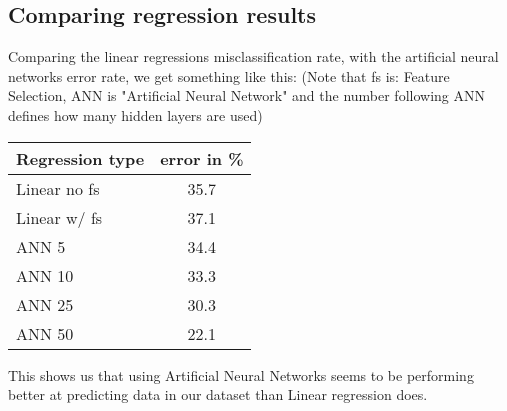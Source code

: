 \subsection{Comparing regression results}
Comparing the linear regressions misclassification rate, with the artificial neural networks error rate, we get something like this: (Note that fs is: Feature Selection, ANN is "Artificial Neural Network" and the number following ANN defines how many hidden layers are used)
\begin{table}
\begin{longtable}{lc} \hline
Regression type & error in \% \\ \hline
Linear no fs & 35.7 \\
Linear w/ fs & 37.1\\
ANN 5 & 34.4 \\
ANN 10 & 33.3 \\
ANN 25 & 30.3 \\
ANN 50 & 22.1\\ \hline
\end{longtable}
\end{table}
This shows us that using Artificial Neural Networks seems to be performing better at predicting data in our dataset than Linear regression does.